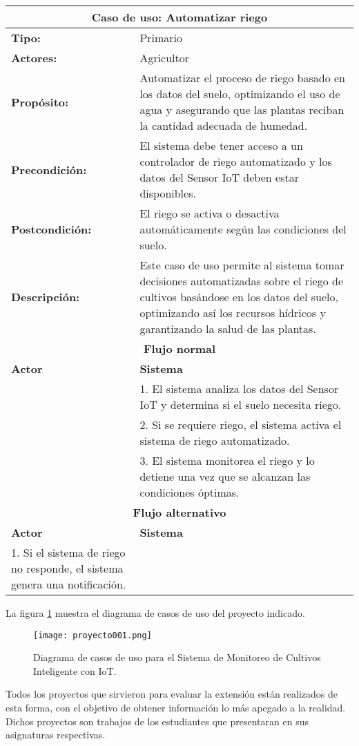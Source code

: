 \begin{longtable}{|p{5cm}|p{5cm}|}
	\hline
	\multicolumn{2}{|c|}{\textbf{Caso de uso: Automatizar riego}} \\
	\hline
	\textbf{Tipo:} & Primario \\
	\hline
	\textbf{Actores:} & Agricultor \\
	\hline
	\textbf{Propósito:} & Automatizar el proceso de riego basado en los datos del suelo, optimizando el uso de agua y asegurando que las plantas reciban la cantidad adecuada de humedad. \\
	\hline
	\textbf{Precondición:} & El sistema debe tener acceso a un controlador de riego automatizado y los datos del Sensor IoT deben estar disponibles. \\
	\hline
	\textbf{Postcondición:} & El riego se activa o desactiva automáticamente según las condiciones del suelo. \\
	\hline
	\textbf{Descripción:} & Este caso de uso permite al sistema tomar decisiones automatizadas sobre el riego de cultivos basándose en los datos del suelo, optimizando así los recursos hídricos y garantizando la salud de las plantas. \\
	\hline
	\multicolumn{2}{|c|}{\textbf{Flujo normal}} \\
	\hline
	\textbf{Actor} & \textbf{Sistema} \\
	\hline
	& 1. El sistema analiza los datos del Sensor IoT y determina si el suelo necesita riego. \\
	\hline
	& 2. Si se requiere riego, el sistema activa el sistema de riego automatizado. \\
	\hline
	& 3. El sistema monitorea el riego y lo detiene una vez que se alcanzan las condiciones óptimas. \\
	\hline
	\multicolumn{2}{|c|}{\textbf{Flujo alternativo}} \\
	\hline
	\textbf{Actor} & \textbf{Sistema} \\
	\hline
	1. Si el sistema de riego no responde, el sistema genera una notificación. & \\
	\hline
\end{longtable}

La figura \ref{fig:cap3_proyecto_001} muestra el diagrama de casos de uso del proyecto indicado.

 \begin{figure}[H]  
	\centering
	\texttt{[image: proyecto001.png]} 
	\caption{Diagrama de casos de uso para el Sistema de Monitoreo de Cultivos Inteligente con IoT.}
	\label{fig:cap3_proyecto_001}
\end{figure}

Todos los proyectos que sirvieron para evaluar la extensión están realizados de esta forma, con el objetivo de obtener información lo más apegado a la realidad. Dichos proyectos son trabajos de los estudiantes que presentaran en sus asignaturas respectivas.